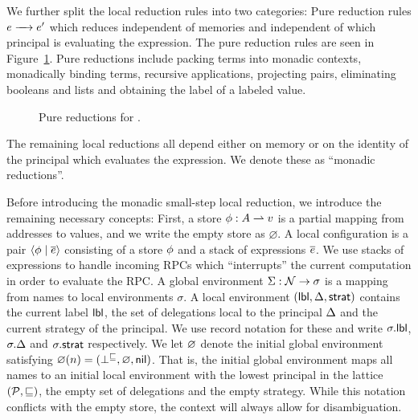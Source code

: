 We further split the local reduction rules into two categories: Pure reduction rules $\steppure{\expr}{\expr'}$ which reduces independent of memories and independent of which principal is evaluating the expression. The pure reduction rules are seen in Figure~\ref{fig:pure-reductions}. Pure reductions include packing terms into monadic contexts, monadically binding terms, recursive applications, projecting pairs, eliminating booleans and lists and obtaining the label of a labeled value.

\begin{figure}
    \centering
    \caption{Pure reductions for \lang.}
    \label{fig:pure-reductions}
\end{figure}

The remaining local reductions all depend either on memory or on the identity of the principal which evaluates the expression. We denote these as ``monadic reductions''.

Before introducing the monadic small-step local reduction, we introduce the remaining necessary concepts: First, a store $\phi: A \rightharpoonup v$ is a partial mapping from addresses to values, and we write the empty store as $\varnothing$. A local configuration is a pair $\langle \phi \mid \overline{e} \rangle$ consisting of a store $\phi$ and a stack of expressions $\overline{e}$. We use stacks of expressions to handle incoming RPCs which ``interrupts'' the current computation in order to evaluate the RPC. A global environment $\Sigma: \mathcal{N} \to \sigma$ is a mapping from names to local environments $\sigma$. A local environment $(\mathsf{lbl}, \Delta, \mathsf{strat})$ contains the current label $\mathsf{lbl}$, the set of delegations local to the principal $\Delta$ and the current strategy of the principal. We use record notation for these and write $\sigma.\mathsf{lbl}$, $\sigma.\Delta$ and $\sigma.\mathsf{strat}$ respectively. We let $\varnothing$ denote the initial global environment satisfying $\varnothing(n) = (\bot^{\sqsubseteq}, \varnothing, \mathsf{nil})$. That is, the initial global environment maps all names to an initial local environment with the lowest principal in the lattice $(\mathcal{P}, \sqsubseteq)$, the empty set of delegations and the empty strategy. While this notation conflicts with the empty store, the context will always allow for disambiguation.

